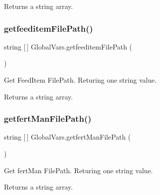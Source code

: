 \begin{DoxyReturn}{Returns}
a string array. 
\end{DoxyReturn}
\mbox{\label{class_global_vars_a3e9bd776f13ec83a538a37aa89438499}} 
\subsubsection{\texorpdfstring{getfeeditemFilePath()}{getfeeditemFilePath()}}
{\footnotesize\ttfamily string \mbox{[}$\,$\mbox{]} Global\+Vars.\+getfeeditem\+File\+Path (\begin{DoxyParamCaption}{ }\end{DoxyParamCaption})\hspace{0.3cm}{\ttfamily [inline]}}



Get Feed\+Item File\+Path. Returing one string value. 

\begin{DoxyReturn}{Returns}
a string array. 
\end{DoxyReturn}
\mbox{\label{class_global_vars_a42b557435cac90388444da5e97b5f7a7}} 
\subsubsection{\texorpdfstring{getfertManFilePath()}{getfertManFilePath()}}
{\footnotesize\ttfamily string \mbox{[}$\,$\mbox{]} Global\+Vars.\+getfert\+Man\+File\+Path (\begin{DoxyParamCaption}{ }\end{DoxyParamCaption})\hspace{0.3cm}{\ttfamily [inline]}}



Get fert\+Man File\+Path. Returing one string value. 

\begin{DoxyReturn}{Returns}
a string array. 
\end{DoxyReturn}
\mbox{\label{class_global_vars_a3c0002e83c4ffabafc32b95bf139f3d9}} 
